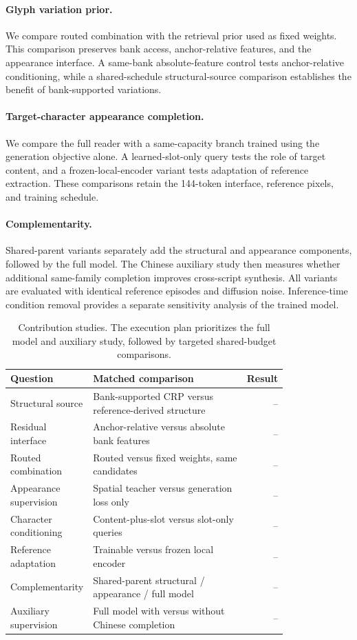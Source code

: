 \documentclass{article}
\begin{document}
\paragraph{Glyph variation prior.}
We compare routed combination with the retrieval prior used as fixed weights.
This comparison preserves bank access, anchor-relative features, and the appearance interface.
A same-bank absolute-feature control tests anchor-relative conditioning, while a shared-schedule structural-source comparison establishes the benefit of bank-supported variations.

\paragraph{Target-character appearance completion.}
We compare the full reader with a same-capacity branch trained using the generation objective alone.
A learned-slot-only query tests the role of target content, and a frozen-local-encoder variant tests adaptation of reference extraction.
These comparisons retain the 144-token interface, reference pixels, and training schedule.

\paragraph{Complementarity.}
Shared-parent variants separately add the structural and appearance components, followed by the full model.
The Chinese auxiliary study then measures whether additional same-family completion improves cross-script synthesis.
All variants are evaluated with identical reference episodes and diffusion noise.
Inference-time condition removal provides a separate sensitivity analysis of the trained model.

\begin{table}[t]
\centering\small
\caption{Contribution studies. The execution plan prioritizes the full model and auxiliary study, followed by targeted shared-budget comparisons.}
\label{tab:ablations}
\begin{tabular}{p{0.24\linewidth}p{0.56\linewidth}r}
\toprule
Question & Matched comparison & Result\\
\midrule
Structural source & Bank-supported CRP versus reference-derived structure & --\\
Residual interface & Anchor-relative versus absolute bank features & --\\
Routed combination & Routed versus fixed weights, same candidates & --\\
Appearance supervision & Spatial teacher versus generation loss only & --\\
Character conditioning & Content-plus-slot versus slot-only queries & --\\
Reference adaptation & Trainable versus frozen local encoder & --\\
Complementarity & Shared-parent structural / appearance / full model & --\\
Auxiliary supervision & Full model with versus without Chinese completion & --\\
\bottomrule
\end{tabular}
\end{table}
\end{document}
